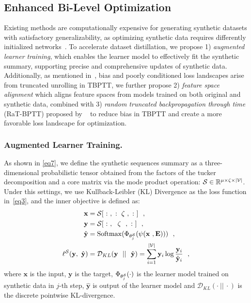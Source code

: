 \subsection{Enhanced Bi-Level Optimization}

Existing methods are computationally expensive for generating synthetic datasets with satisfactory generalizability, as optimizing synthetic data requires differently initialized networks~\cite{yu2023dataset}. To accelerate dataset distillation, we propose 1) \emph{augmented learner training}, which enables the learner model to effectively fit the synthetic summary, supporting precise and comprehensive updates of synthetic data. Additionally, as mentioned in~\cite{wu2018understanding, metz2019understanding}, bias and poorly conditioned loss landscapes arise from truncated unrolling in TBPTT, we further propose 2) \emph{feature space alignment} which aligns feature spaces from models trained on both original and synthetic data, combined with 3) \emph{random truncated backpropagation through time} (RaT-BPTT) proposed by ~\cite{feng2023embarrassingly} to reduce bias in TBPTT and create a more favorable loss landscape for optimization.

\subsubsection{Augmented Learner Training.}

As shown in \cref{eq7}, we define the synthetic sequences summary as a three-dimensional probabilistic tensor obtained from the factors of the tucker decomposition and a core matrix via the mode product operation: $\mathcal{S} \in \mathbb{R}^{\mu \times \zeta \times |\mathcal{V}|}$. 
Under this settings, we use Kullback-Leibler (KL) Divergence as the loss function in~\cref{eq3}, and the inner objective is defined as:
\begin{equation}
    \begin{aligned}
    \mathbf{x} &= \mathcal{S}[~:~,~:~\zeta~,~:~] ~~, \\
    \mathbf{y} &= \mathcal{S}[~:~,~~\zeta~~,~:~] ~~, \\
    \hat{\mathbf{y}} &= \operatorname{Softmax}(\Phi_{\theta^{\mathcal{S}}_j}(\psi(\mathbf{x}~, \mathbf{E}))) ~~, \\
    \ell^{\mathcal{S}}(\mathbf{y},~ \hat{\mathbf{y}}) &= \mathcal{D}_{KL}(\mathbf{y} ~~||~~ \hat{\mathbf{y}}) = \sum_{i=1}^{|\mathcal{V}|} \mathbf{y}_i \log \frac{\mathbf{y}_i}{\hat{\mathbf{y}}_i} ~~,
    \end{aligned}
\end{equation}
where $\mathbf{x}$ is the input, $\mathbf{y}$ is the target, $\Phi_{\theta^{\mathcal{S}}_j}(\cdot)$ is the learner model trained on synthetic data in $j$-th step, $\hat{\mathbf{y}}$ is output of the learner model and $\mathcal{D}_{KL}(\cdot ~||~ \cdot)$ is the discrete pointwise KL-divergence.

